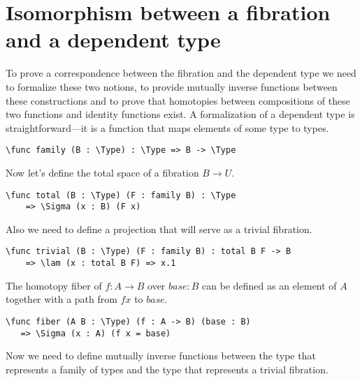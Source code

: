 \section{Isomorphism between a fibration and a dependent type}

To prove a correspondence between the fibration and the dependent type we need to formalize these two notions, to provide mutually inverse functions between these constructions and to prove that homotopies between compositions of these two functions and identity functions exist. 
A formalization of a dependent type is straightforward---it is a function that maps elements of some type to types.

\begin{ListingEnv}[H]
\begin{lstlisting}
\func family (B : \Type) : \Type => B -> \Type
\end{lstlisting}
\end{ListingEnv}

Now let's define the total space of a fibration $B \to U$.

\begin{ListingEnv}[H]
\begin{lstlisting}
\func total (B : \Type) (F : family B) : \Type 
	=> \Sigma (x : B) (F x)
\end{lstlisting}
\end{ListingEnv}

Also we need to define a projection that will serve as a trivial fibration.

\begin{ListingEnv}[H]
\begin{lstlisting}
\func trivial (B : \Type) (F : family B) : total B F -> B 
	=> \lam (x : total B F) => x.1
\end{lstlisting}
\end{ListingEnv}

The homotopy fiber of $f : A \to B$ over $base : B$ can be defined as an element of $A$ together with a path from $f x$ to $base$.

\begin{ListingEnv}[H]
\begin{lstlisting}
\func fiber (A B : \Type) (f : A -> B) (base : B)
   => \Sigma (x : A) (f x = base)
\end{lstlisting}
\end{ListingEnv}

Now we need to define mutually inverse functions between the type that represents a family of types and the type that represents a trivial fibration. 
  
